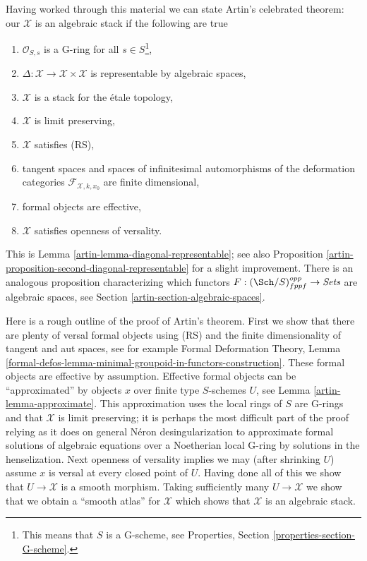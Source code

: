 \medskip\noindent
Having worked through this material we can state Artin's celebrated
theorem: our $\mathcal{X}$ is an algebraic stack if the following are true
\begin{enumerate}
\item $\mathcal{O}_{S, s}$ is a G-ring for all $s \in S$\footnote{This
means that $S$ is a G-scheme, see
Properties, Section \ref{properties-section-G-scheme}.},
\item $\Delta : \mathcal{X} \to \mathcal{X} \times \mathcal{X}$
is representable by algebraic spaces,
\item $\mathcal{X}$ is a stack for the \'etale topology,
\item $\mathcal{X}$ is limit preserving,
\item $\mathcal{X}$ satisfies (RS),
\item tangent spaces and spaces of infinitesimal automorphisms
of the deformation categories $\mathcal{F}_{\mathcal{X}, k, x_0}$
are finite dimensional,
\item formal objects are effective,
\item $\mathcal{X}$ satisfies openness of versality.
\end{enumerate}
This is Lemma \ref{artin-lemma-diagonal-representable}; see also
Proposition \ref{artin-proposition-second-diagonal-representable}
for a slight improvement. There is an analogous proposition
characterizing which functors $F : (\Sch/S)_{fppf}^{opp} \to \textit{Sets}$
are algebraic spaces, see Section \ref{artin-section-algebraic-spaces}.

\medskip\noindent
Here is a rough outline of the proof of Artin's theorem.
First we show that there are plenty of versal formal objects
using (RS) and the finite dimensionality of tangent and aut spaces, see
for example Formal Deformation Theory, Lemma
\ref{formal-defos-lemma-minimal-groupoid-in-functors-construction}.
These formal objects are effective by assumption.
Effective formal objects can be ``approximated'' by objects $x$ over
finite type $S$-schemes $U$, see Lemma \ref{artin-lemma-approximate}.
This approximation uses the local rings of $S$ are G-rings and
that $\mathcal{X}$ is limit preserving; it is perhaps the most difficult
part of the proof relying as it does on general N\'eron desingularization to
approximate formal solutions of algebraic equations over a Noetherian local
G-ring by solutions in the henselization.
Next openness of versality implies we may (after shrinking $U$)
assume $x$ is versal at every closed point of $U$.
Having done all of this we show that $U \to \mathcal{X}$
is a smooth morphism. Taking sufficiently many $U \to \mathcal{X}$
we show that we obtain a ``smooth atlas'' for $\mathcal{X}$ which shows
that $\mathcal{X}$ is an algebraic stack.

